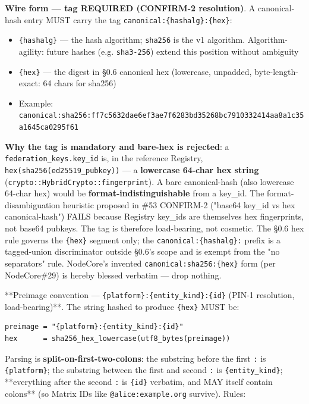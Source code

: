 \documentclass[10pt]{article}
\begin{document}
\textbf{Wire form — tag REQUIRED (CONFIRM-2 resolution)}. A canonical-hash entry MUST carry the tag \texttt{canonical:\{hashalg\}:\{hex\}}:


\begin{itemize}\setlength\itemsep{0pt}
\item \texttt{\{hashalg\}} — the hash algorithm; \texttt{sha256} is the v1 algorithm. Algorithm-agility: future hashes (e.g. \texttt{sha3-256}) extend this position without ambiguity
\item \texttt{\{hex\}} — the digest in §0.6 canonical hex (lowercase, unpadded, byte-length-exact: 64 chars for sha256)
\item Example: \texttt{canonical:sha256:ff7c5632dae6ef3ae7f6283bd35268bc7910332414aa8a1c35a1645ca0295f61}
\end{itemize}


\textbf{Why the tag is mandatory and bare-hex is rejected}: a \texttt{federation\_keys.key\_id} is, in the reference Registry, \texttt{hex(sha256(ed25519\_pubkey))} — a \textbf{lowercase 64-char hex string} (\texttt{crypto::HybridCrypto::fingerprint}). A bare canonical-hash (also lowercase 64-char hex) would be \textbf{format-indistinguishable} from a key\_id. The format-disambiguation heuristic proposed in \#53 CONFIRM-2 ("base64 key\_id vs hex canonical-hash") FAILS because Registry key\_ids are themselves hex fingerprints, not base64 pubkeys. The tag is therefore load-bearing, not cosmetic. The §0.6 hex rule governs the \texttt{\{hex\}} segment only; the \texttt{canonical:\{hashalg\}:} prefix is a tagged-union discriminator outside §0.6's scope and is exempt from the "no separators" rule. NodeCore's invented \texttt{canonical:sha256:\{hex\}} form (per NodeCore\#29) is hereby blessed verbatim — drop nothing.


**Preimage convention — \texttt{\{platform\}:\{entity\_kind\}:\{id\}} (PIN-1 resolution, load-bearing)**. The string hashed to produce \texttt{\{hex\}} MUST be:


\begin{lstlisting}
preimage = "{platform}:{entity_kind}:{id}"
hex      = sha256_hex_lowercase(utf8_bytes(preimage))
\end{lstlisting}

Parsing is \textbf{split-on-first-two-colons}: the substring before the first \texttt{:} is \texttt{\{platform\}}; the substring between the first and second \texttt{:} is \texttt{\{entity\_kind\}}; **everything after the second \texttt{:} is \texttt{\{id\}} verbatim, and MAY itself contain colons** (so Matrix IDs like \texttt{@alice:example.org} survive). Rules:
\end{document}
